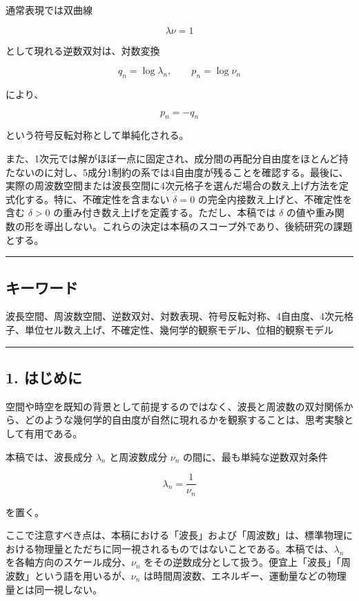 \documentclass[
]{ltjsarticle}
\begin{document}
通常表現では双曲線

\[
\lambda\nu=1
\]

として現れる逆数双対は、対数変換

\[
q_n=\log \lambda_n,\qquad p_n=\log \nu_n
\]

により、

\[
p_n=-q_n
\]

という符号反転対称として単純化される。

また、1次元では解がほぼ一点に固定され、成分間の再配分自由度をほとんど持たないのに対し、5成分1制約の系では4自由度が残ることを確認する。最後に、実際の周波数空間または波長空間に4次元格子を選んだ場合の数え上げ方法を定式化する。特に、不確定性を含まない
\(\delta=0\) の完全内接数え上げと、不確定性を含む \(\delta>0\)
の重み付き数え上げを定義する。ただし、本稿では \(\delta\)
の値や重み関数の形を導出しない。これらの決定は本稿のスコープ外であり、後続研究の課題とする。

\begin{center}\rule{0.5\linewidth}{0.5pt}\end{center}

\subsection{キーワード}\label{ux30adux30fcux30efux30fcux30c9}

波長空間、周波数空間、逆数双対、対数表現、符号反転対称、4自由度、4次元格子、単位セル数え上げ、不確定性、幾何学的観察モデル、位相的観察モデル

\begin{center}\rule{0.5\linewidth}{0.5pt}\end{center}

\subsection{1. はじめに}\label{ux306fux3058ux3081ux306b}

空間や時空を既知の背景として前提するのではなく、波長と周波数の双対関係から、どのような幾何学的自由度が自然に現れるかを観察することは、思考実験として有用である。

本稿では、波長成分 \(\lambda_n\) と周波数成分 \(\nu_n\)
の間に、最も単純な逆数双対条件

\[
\lambda_n=\frac{1}{\nu_n}
\]

を置く。

ここで注意すべき点は、本稿における「波長」および「周波数」は、標準物理における物理量とただちに同一視されるものではないことである。本稿では、\(\lambda_n\)
を各軸方向のスケール成分、\(\nu_n\)
をその逆数成分として扱う。便宜上「波長」「周波数」という語を用いるが、\(\nu_n\)
は時間周波数、エネルギー、運動量などの物理量とは同一視しない。
\end{document}
